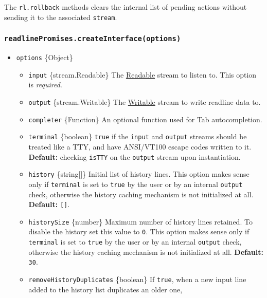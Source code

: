 The \texttt{rl.rollback} methods clears the internal list of pending
actions without sending it to the associated \texttt{stream}.

\subsubsection{\texorpdfstring{\texttt{readlinePromises.createInterface(options)}}{readlinePromises.createInterface(options)}}\label{readlinepromises.createinterfaceoptions}

\begin{itemize}
\tightlist
\item
  \texttt{options} \{Object\}

  \begin{itemize}
  \tightlist
  \item
    \texttt{input} \{stream.Readable\} The
    \href{stream.md\#readable-streams}{Readable} stream to listen to.
    This option is \emph{required}.
  \item
    \texttt{output} \{stream.Writable\} The
    \href{stream.md\#writable-streams}{Writable} stream to write
    readline data to.
  \item
    \texttt{completer} \{Function\} An optional function used for Tab
    autocompletion.
  \item
    \texttt{terminal} \{boolean\} \texttt{true} if the \texttt{input}
    and \texttt{output} streams should be treated like a TTY, and have
    ANSI/VT100 escape codes written to it. \textbf{Default:} checking
    \texttt{isTTY} on the \texttt{output} stream upon instantiation.
  \item
    \texttt{history} \{string{[}{]}\} Initial list of history lines.
    This option makes sense only if \texttt{terminal} is set to
    \texttt{true} by the user or by an internal \texttt{output} check,
    otherwise the history caching mechanism is not initialized at all.
    \textbf{Default:} \texttt{{[}{]}}.
  \item
    \texttt{historySize} \{number\} Maximum number of history lines
    retained. To disable the history set this value to \texttt{0}. This
    option makes sense only if \texttt{terminal} is set to \texttt{true}
    by the user or by an internal \texttt{output} check, otherwise the
    history caching mechanism is not initialized at all.
    \textbf{Default:} \texttt{30}.
  \item
    \texttt{removeHistoryDuplicates} \{boolean\} If \texttt{true}, when
    a new input line added to the history list duplicates an older one,

\end{itemize}
\end{itemize}
